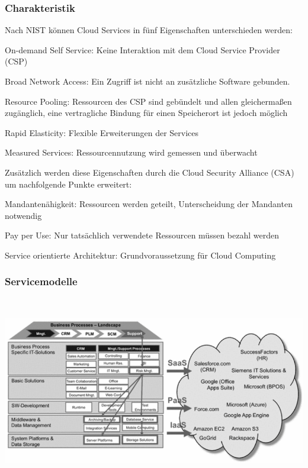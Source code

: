 \documentclass[12pt,a4paper,bibliography=totocnumbered,listof=totocnumbered]{scrartcl}
\begin{document}
\cite{33} \cite[S. 78/80/91/160f.]{45}

\subsubsection{Charakteristik}
Nach NIST \cite[S. 2f.]{34} können Cloud Services in fünf Eigenschaften unterschieden werden:
\begin{compactitem}
	\item On-demand Self Service: Keine Interaktion mit dem Cloud Service Provider (CSP)
	\item Broad Network Access: Ein Zugriff ist nicht an zusätzliche Software gebunden.
	\item Resource Pooling: Ressourcen des CSP sind gebündelt und allen gleichermaßen zugänglich, eine vertragliche Bindung für einen Speicherort ist jedoch möglich
	\item Rapid Elasticity: Flexible Erweiterungen der Services
	\item Measured Services: Ressourcennutzung wird gemessen und überwacht
\end{compactitem}

Zusätzlich werden diese Eigenschaften durch die Cloud Security Alliance (CSA) \cite[S. 14 ff.]{36} um nachfolgende Punkte erweitert:
\begin{compactitem}
	\item Mandantenähigkeit: Ressourcen werden geteilt, Unterscheidung der Mandanten notwendig
	\item Pay per Use: Nur tatsächlich verwendete Ressourcen müssen bezahl werden
	\item Service orientierte Architektur: Grundvoraussetzung für Cloud Computing
\end{compactitem}

\subsubsection{Servicemodelle}

\vspace{1em}
$\;$\\
\begin{minipage}{\linewidth}
	\centering
	\includegraphics[width=1.0\linewidth]{IaaS_Modelle.png}
\end{minipage}
\vspace{1em}
\end{document}
